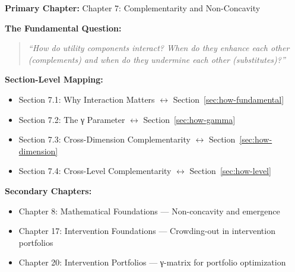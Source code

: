 %
%
%
%

\begin{tcolorbox}[colback=purple!5!white, colframe=purple!75!black,
    title=Chapter Linkage]

\textbf{Primary Chapter:} Chapter 7: Complementarity and Non-Concavity

\vspace{0.3em}
\textbf{The Fundamental Question:}
\begin{quote}
\textit{``How do utility components interact? When do they enhance each other (complements) and when do they undermine each other (substitutes)?''}
\end{quote}

\textbf{Section-Level Mapping:}
\begin{itemize}[nosep]
\item Section 7.1: Why Interaction Matters $\leftrightarrow$ Section~\ref{sec:how-fundamental}
\item Section 7.2: The γ Parameter $\leftrightarrow$ Section~\ref{sec:how-gamma}
\item Section 7.3: Cross-Dimension Complementarity $\leftrightarrow$ Section~\ref{sec:how-dimension}
\item Section 7.4: Cross-Level Complementarity $\leftrightarrow$ Section~\ref{sec:how-level}
\end{itemize}

\textbf{Secondary Chapters:}
\begin{itemize}[nosep]
\item Chapter 8: Mathematical Foundations --- Non-concavity and emergence
\item Chapter 17: Intervention Foundations --- Crowding-out in intervention portfolios
\item Chapter 20: Intervention Portfolios --- γ-matrix for portfolio optimization
\end{itemize}


\end{tcolorbox}

